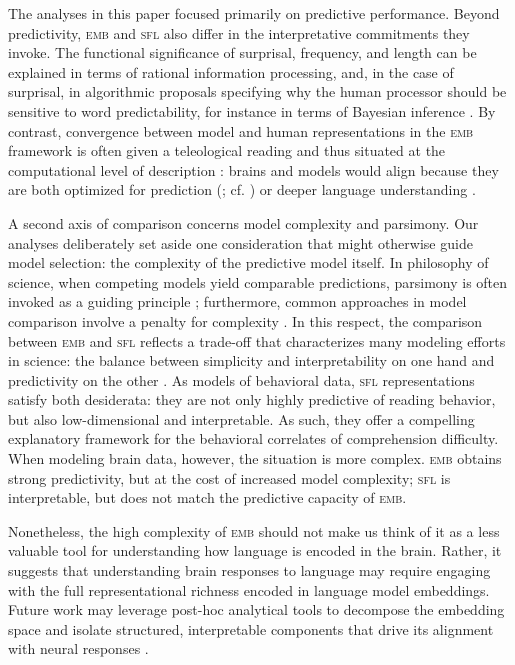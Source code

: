 \documentclass[11pt]{article}
\begin{document}
\smallskip 

The analyses in this paper focused primarily on predictive performance. Beyond predictivity, \textsc{emb} and \textsc{sfl} also differ in the interpretative commitments they invoke. The functional significance of surprisal, frequency, and length can be explained in terms of rational information processing, and, in the case of surprisal, in algorithmic proposals specifying why the human processor should be sensitive to word predictability, for instance in terms of Bayesian inference \citep{marr1982vision, bicknell2010rational}. By contrast, convergence between model and human representations in the \textsc{emb} framework is often given a teleological reading \citep{cichy2019deep} and thus situated at the computational level of description \citep{marr1982vision}: brains and models would align because they are both optimized for prediction (\citealp{schrimpf2021neural, caucheteux2022brains}; cf. \citealp{antonello2024predictive}) or deeper language understanding \citep{aw2022training}. 

\smallskip

A second axis of comparison concerns model complexity and parsimony. Our analyses deliberately set aside one consideration that might otherwise guide model selection: the complexity of the predictive model itself. In philosophy of science, when competing models yield comparable predictions, parsimony is often invoked as a guiding principle \citep{occam1495quaestiones}; furthermore, common approaches in model comparison involve a penalty for complexity \citep{aic}. In this respect, the comparison between \textsc{emb} and \textsc{sfl} reflects a trade-off that characterizes many modeling efforts in science: the balance between simplicity and interpretability on one hand and predictivity on the other \citep{tuckute2023driving}. As models of behavioral data, \textsc{sfl} representations satisfy both desiderata: they are not only highly predictive of reading behavior, but also low-dimensional and interpretable. As such, they offer a compelling explanatory framework for the behavioral correlates of comprehension difficulty. When modeling brain data, however, the situation is more complex. \textsc{emb} obtains strong predictivity, but at the cost of increased model complexity; \textsc{sfl} is interpretable, but does not match the predictive capacity of \textsc{emb}. 

\smallskip

Nonetheless, the high complexity of \textsc{emb} should not make us think of it as a less valuable tool for understanding how language is encoded in the brain. Rather, it suggests that understanding brain responses to language may require engaging with the full representational richness encoded in language model embeddings. Future work may leverage post-hoc analytical tools to decompose the embedding space and isolate structured, interpretable components that drive its alignment with neural responses \citep{tuckute2023driving}. 
\end{document}
